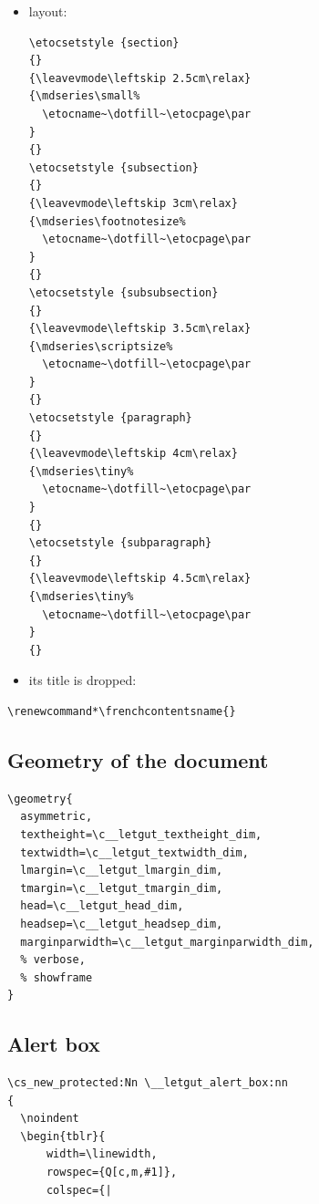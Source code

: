 \documentclass{letgut}
\begin{document}
\begin{itemize}
\item layout:
\begin{lstlisting}
\etocsetstyle {section}
{}
{\leavevmode\leftskip 2.5cm\relax}
{\mdseries\small%
  \etocname~\dotfill~\etocpage\par
}
{}
\etocsetstyle {subsection}
{}
{\leavevmode\leftskip 3cm\relax}
{\mdseries\footnotesize%
  \etocname~\dotfill~\etocpage\par
}
{}
\etocsetstyle {subsubsection}
{}
{\leavevmode\leftskip 3.5cm\relax}
{\mdseries\scriptsize%
  \etocname~\dotfill~\etocpage\par
}
{}
\etocsetstyle {paragraph}
{}
{\leavevmode\leftskip 4cm\relax}
{\mdseries\tiny%
  \etocname~\dotfill~\etocpage\par
}
{}
\etocsetstyle {subparagraph}
{}
{\leavevmode\leftskip 4.5cm\relax}
{\mdseries\tiny%
  \etocname~\dotfill~\etocpage\par
}
{}
\end{lstlisting}
\item its title is dropped:
\end{itemize}
\begin{lstlisting}
\renewcommand*\frenchcontentsname{}
\end{lstlisting}

\subsection{Geometry of the document}
\label{sec:org282c9ab}

\begin{lstlisting}
\geometry{
  asymmetric,
  textheight=\c__letgut_textheight_dim,
  textwidth=\c__letgut_textwidth_dim,
  lmargin=\c__letgut_lmargin_dim,
  tmargin=\c__letgut_tmargin_dim,
  head=\c__letgut_head_dim,
  headsep=\c__letgut_headsep_dim,
  marginparwidth=\c__letgut_marginparwidth_dim,
  % verbose,
  % showframe
}
\end{lstlisting}

\subsection{Alert box}
\label{sec:org1d5f02b}

\begin{lstlisting}
\cs_new_protected:Nn \__letgut_alert_box:nn
{
  \noindent
  \begin{tblr}{
      width=\linewidth,
      rowspec={Q[c,m,#1]},
      colspec={|
\end{lstlisting}
\end{document}
